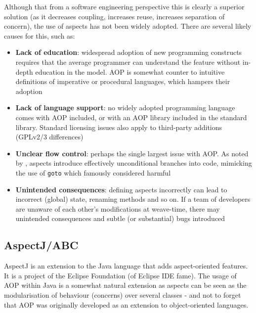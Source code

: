         Although that from a software engineering perspective this is clearly a superior solution (as it decreases coupling, increases reuse, increases separation of concern), the use of aspects has not been widely adopted. There are several likely causes for this, such as:

        \begin{itemize}
                \item \textbf{Lack of education}: widespread adoption of new programming constructs requires that the average programmer can understand the feature without in-depth education in the model. AOP is somewhat counter to intuitive definitions of imperative or procedural languages, which hampers their adoption
                
                \item \textbf{Lack of language support}: no widely adopted programming language comes with AOP included, or with an AOP library included in the standard library. Standard licensing issues also apply to third-party additions (\eg GPLv2/3 differences)
                
                \item \textbf{Unclear flow control}: perhaps the single largest issue with AOP. As noted by \citet{Constantinides2004}, aspects introduce effectively unconditional branches into code, mimicking the use of \texttt{goto} which \citeauthor{Dijkstra1968} famously considered harmful \citep{Dijkstra1968}
                
                \item \textbf{Unintended consequences}: defining aspects incorrectly can lead to incorrect (global) state, \eg renaming methods and so on. If a team of developers are unaware of each other's modifications at weave-time, there may unintended consequences and subtle (or substantial) bugs introduced
        \end{itemize}

        \subsection{AspectJ/ABC} \label{sec:instrumentation/aop/aspectj}
        AspectJ \citep{Kiczales2001} is an extension to the Java language that adds aspect-oriented features. It is a project of the Eclipse Foundation (of Eclipse IDE fame). The usage of AOP within Java is a somewhat natural extension as aspects can be seen as the modularisation of behaviour (concerns) over several classes - and not to forget that AOP was originally developed as an extension to object-oriented languages.

